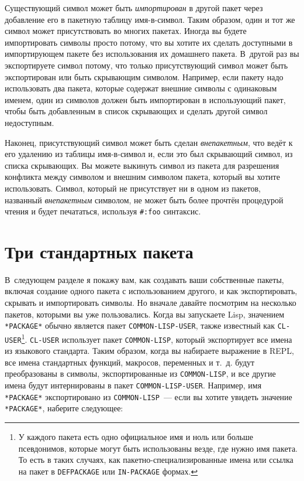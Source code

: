 Существующий символ может быть \textit{импортирован} в другой пакет через добавление его в
пакетную таблицу имя-в-символ.  Таким образом, один и тот же символ может присутствовать
во многих пакетах. Иногда вы будете импортировать символы просто потому, что вы хотите их
сделать доступными в импортирующем пакете без использования их домашнего пакета. В~другой
раз вы экспортируете символ потому, что только присутствующий символ может быть
экспортирован или быть скрывающим символом. Например, если пакету надо использовать два
пакета, которые содержат внешние символы с одинаковым именем, один из символов должен быть
импортирован в ис\-поль\-зую\-щий пакет, чтобы быть добавленным в список скрывающих и сделать
другой символ недоступным.

Наконец, присутствующий символ может быть сделан \textit{внепакетным}, что ведёт к его
удалению из таблицы имя-в-символ и, если это был скрывающий символ, из списка скрывающих.
Вы можете выкинуть символ из пакета для разрешения конфликта между символом и внешним
символом пакета, который вы хотите использовать. Символ, который не присутствует ни в
одном из пакетов, названный \textit{внепакетным} символом, не может быть более прочтён
процедурой чтения и будет печататься, используя \lstinline!#:foo! синтаксис.

\section{Три стандартных пакета}
 
В~следующем разделе я покажу вам, как создавать ваши собственные пакеты, включая создание
одного пакета с использованием другого, и как экспортировать, скрывать и импортировать
символы. Но вначале давайте посмотрим на несколько пакетов, которыми вы уже
пользовались. Когда вы запускаете Lisp, значением \lstinline{*PACKAGE*} обычно является пакет
\lstinline{COMMON-LISP-USER}, также известный как \lstinline{CL-USER}\footnote{У каждого пакета
  есть одно официальное имя и ноль или больше псевдонимов, которые могут быть использованы
  везде, где нужно имя пакета. То есть в таких случаях, как пакетно-специализированные
  имена или ссылка на пакет в \lstinline{DEFPACKAGE} или \lstinline{IN-PACKAGE} формах.}.
\lstinline{CL-USER} использует пакет \lstinline{COMMON-LISP}, который экспортирует все имена из
языкового стандарта. Таким образом, когда вы набираете выражение в REPL, все имена
стандартных функций, макросов, переменных и т.~д. будут преобразованы в символы,
экспортированные из \lstinline{COMMON-LISP}, и все другие имена будут интернированы в пакет
\lstinline{COMMON-LISP-USER}. Например, имя \lstinline{*PACKAGE*} экспортировано из
\lstinline{COMMON-LISP}~--- если вы хотите увидеть значение \lstinline{*PACKAGE*}, наберите
следующее:

